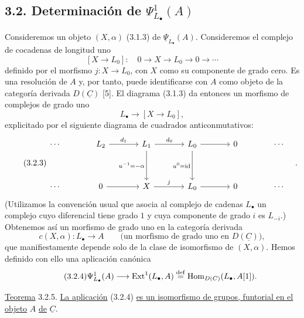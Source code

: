 \subsection*{3.2. Determinación de $\Psi^1_{L_\bullet}(A)$}

Consideremos un objeto $(X,\alpha)$ (3.1.3) de
$\underline\Psi_{L_\bullet}(A)$. Consideremos el complejo de
cocadenas de longitud uno
\begin{equation}\tag{3.2.1}
 [X\longrightarrow L_0]:\quad
 0\longrightarrow X\longrightarrow L_0\longrightarrow0\longrightarrow
 \cdots
\end{equation}
definido por el morfismo $j:X\longrightarrow L_0$, con $X$ como su
componente de grado cero. Es una resolución de $A$ y, por tanto, puede
identificarse con $A$ como objeto de la categoría derivada
$D(\underline C)$ [5]. El diagrama (3.1.3) da entonces un morfismo de
complejos de grado uno
\begin{equation}\tag{3.2.2}
 L_\bullet\longrightarrow[X\longrightarrow L_0],
\end{equation}
explicitado por el siguiente diagrama de cuadrados anticonmutativos:
\begin{equation}\tag{3.2.3}
\begin{tikzcd}[column sep=large,row sep=huge]
 \cdots & L_2\arrow[r,"d_1"]
 & L_1\arrow[r,"d_0"]\arrow[d,"u^{-1}=-\alpha"']
 & L_0\arrow[r]\arrow[d,"u^0=\mathrm{id}"'] & 0 & \cdots\\
 \cdots & 0\arrow[r] & X\arrow[r,"j"] & L_0\arrow[r] & 0 & \cdots
\end{tikzcd}\quad .
\end{equation}
(Utilizamos la convención usual que asocia al complejo de cadenas
$L_\bullet$ un complejo cuyo diferencial tiene grado $1$ y cuya
componente de grado $i$ es $L_{-i}$.) Obtenemos así un morfismo de
grado uno en la categoría derivada
\begin{equation}\tag{3.2.3}
 c(X,\alpha):L_\bullet\longrightarrow A
 \qquad
 \bigl(\text{un morfismo de grado uno en }D(\underline C)\bigr),
\end{equation}
que manifiestamente depende solo de la clase de isomorfismo de
$(X,\alpha)$. Hemos definido con ello una aplicación canónica
\begin{equation}\tag{3.2.4}
 \Psi^1_{L_\bullet}(A)\longrightarrow\operatorname{Ext}^1(L_\bullet,A)
 \overset{\mathrm{def}}{=}
 \operatorname{Hom}_{D(C)}(L_\bullet,A[1]).
\end{equation}

\underline{Teorema} 3.2.5. \underline{La aplicación} (3.2.4)
\underline{es un isomorfismo de grupos, funtorial en el objeto}
$A$ \underline{de} $\underline C$.

